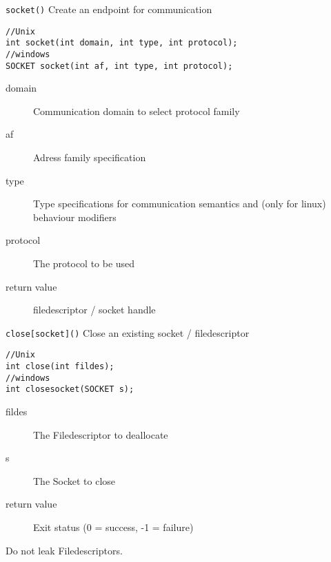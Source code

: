 
\begin{frame}[fragile]{\texttt{socket()}}
	Create an endpoint for communication
	\begin{lstlisting}[numbers=none,morekeywords={*,SOCKET,socklen_t,sockaddr}]
//Unix
int socket(int domain, int type, int protocol);
//windows
SOCKET socket(int af, int type, int protocol);
	\end{lstlisting}
	\begin{description}
		\item [domain] Communication domain to select protocol family
		\item [af] Adress family specification
		\item [type] Type specifications for communication semantics and (only for linux) behaviour modifiers
		\item [protocol] The protocol to be used
		\item [return value] filedescriptor / socket handle
	\end{description}
	\bigskip
\end{frame}


\begin{frame}[fragile]{\texttt{close[socket]()}}
Close an existing socket / filedescriptor
	\begin{lstlisting}[numbers=none,morekeywords={*,SOCKET,socklen_t,sockaddr}]
//Unix
int close(int fildes);
//windows
int closesocket(SOCKET s);
	\end{lstlisting}
	\begin{description}
		\item [fildes] The Filedescriptor to deallocate
		\item [s] The Socket to close
		\item [return value] Exit status (0 = success, -1 = failure)
	\end{description}
	\bigskip
	Do not leak Filedescriptors.
\end{frame}

